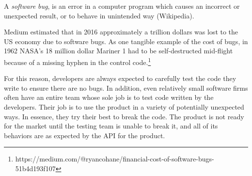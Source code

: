 \begin{definition}
A \emph{software bug}, is an error in a computer program which causes an incorrect or unexpected result, or to behave in unintended way (Wikipedia). 
\end{definition} 

Medium estimated that in 2016 approximately a trillion dollars was lost to the US economy due to software bugs. As one tangible example of the cost of bugs, in 1962 NASA's 18 million dollar Mariner 1 had to be self-destructed mid-flight because of a missing hyphen in the control code.\footnote{https://medium.com/@ryancohane/financial-cost-of-software-bugs-51b4d193f107}

For this reason, developers are always expected to carefully test the code they write to ensure there are no bugs. In addition, even relatively small software firms often have an entire team whose sole job is to test code written by the developers. Their job is to use the product in a variety of potentially unexpected ways. In essence, they try their best to break the code. The product is not ready for the market until the testing team is unable to break it, and all of its behaviors are as expected by the API for the product. 